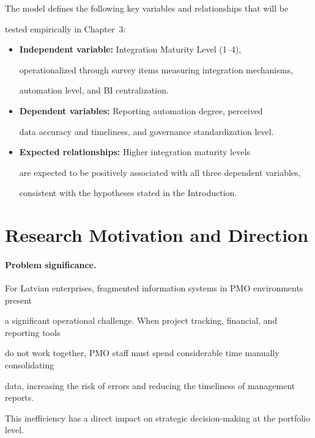 The model defines the following key variables and relationships that will be  

tested empirically in Chapter~3: 

  

\begin{itemize} 

    \item \textbf{Independent variable:} Integration Maturity Level (1--4),  

    operationalized through survey items measuring integration mechanisms,  

    automation level, and BI centralization. 

    \item \textbf{Dependent variables:} Reporting automation degree, perceived  

    data accuracy and timeliness, and governance standardization level. 

    \item \textbf{Expected relationships:} Higher integration maturity levels  

    are expected to be positively associated with all three dependent variables,  

    consistent with the hypotheses stated in the Introduction. 

\end{itemize} 

\section{Research Motivation and Direction} 

\label{sec:motivation} 

 

\paragraph{Problem significance.} 

For Latvian enterprises, fragmented information systems in PMO environments present 

a significant operational challenge. When project tracking, financial, and reporting tools 

do not work together, PMO staff must spend considerable time manually consolidating 

data, increasing the risk of errors and reducing the timeliness of management reports. 

This inefficiency has a direct impact on strategic decision-making at the portfolio level. 

